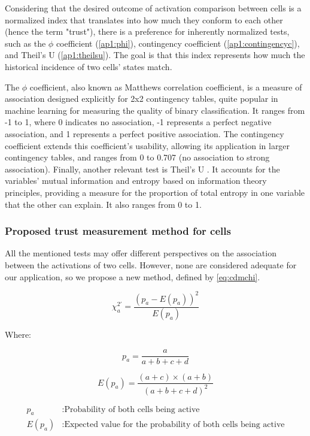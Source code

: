 Considering that the desired outcome of activation comparison between cells is a normalized index that translates into how much they conform to each other (hence the term "trust"), there is a preference for inherently normalized tests, such as the $\phi$ coefficient (\ref{ap1:phi}), contingency coefficient (\ref{ap1:contingencyc}), and Theil's U (\ref{ap1:theilsu}). The goal is that this index represents how much the historical incidence of two cells' states match.

The $\phi$ coefficient, also known as Matthews correlation coefficient, is a measure of association designed explicitly for 2x2 contingency tables, quite popular in machine learning for measuring the quality of binary classification. It ranges from -1 to 1, where 0 indicates no association, -1 represents a perfect negative association, and 1 represents a perfect positive association. The contingency coefficient extends this coefficient's usability, allowing its application in larger contingency tables, and ranges from 0 to 0.707 (no association to strong association).
Finally, another relevant test is Theil's U . It accounts for the variables' mutual information and entropy based on information theory principles, providing a measure for the proportion of total entropy in one variable that the other can explain. It also ranges from 0 to 1.

\subsubsection{Proposed trust measurement method for cells}

All the mentioned tests may offer different perspectives on the association between the activations of two cells. However, none are considered adequate for our application, so we propose a new method, defined by \ref{eq:cdmchi}.

\begin{equation} \label{eq:cdmchi}
    \chi_a^{2'} = \frac{(p_a - E(p_a))^2}{E(p_a)}
\end{equation}

Where:

\[
    p_a = \frac{a}{a+b+c+d}
\]

\[
    E(p_a) = \frac{(a + c) \times (a + b)}{(a+b+c+d)^2}
\]

\begin{align*}
    p_a &: \text{Probability of both cells being active} \\
    E(p_a) &: \text{Expected value for the probability of both cells being active}
\end{align*}

